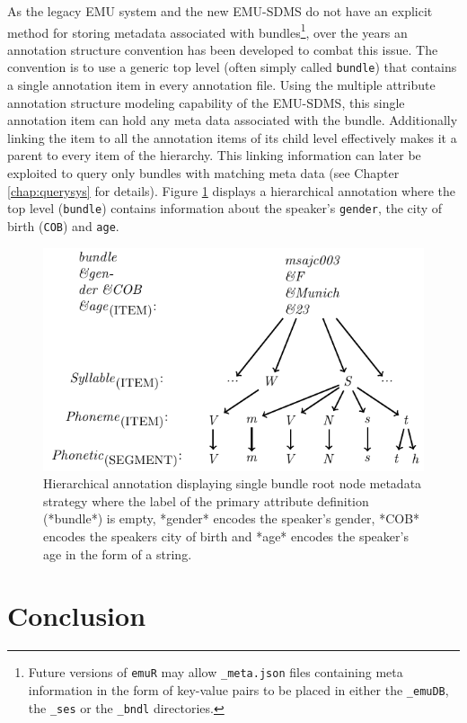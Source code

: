\documentclass[]{book}
\let\rmarkdownfootnote\footnote%
\def\footnote{\protect\rmarkdownfootnote}
\theoremstyle{definition}
\theoremstyle{definition}
\theoremstyle{definition}
\theoremstyle{remark}
\begin{document}
As the legacy EMU system and the new EMU-SDMS do not have an explicit
method for storing metadata associated with bundles\footnote{Future
  versions of \texttt{emuR} may allow \texttt{\_meta.json} files
  containing meta information in the form of key-value pairs to be
  placed in either the \texttt{\_emuDB}, the \texttt{\_ses} or the
  \texttt{\_bndl} directories.}, over the years an annotation structure
convention has been developed to combat this issue. The convention is to
use a generic top level (often simply called \texttt{bundle}) that
contains a single annotation item in every annotation file. Using the
multiple attribute annotation structure modeling capability of the
EMU-SDMS, this single annotation item can hold any meta data associated
with the bundle. Additionally linking the item to all the annotation
items of its child level effectively makes it a parent to every item of
the hierarchy. This linking information can later be exploited to query
only bundles with matching meta data (see Chapter \ref{chap:querysys}
for details). Figure \ref{fig:singleBundleRootNode} displays a
hierarchical annotation where the top level (\texttt{bundle}) contains
information about the speaker's \texttt{gender}, the city of birth
(\texttt{COB}) and \texttt{age}.

\begin{figure}

{\centering \includegraphics[width=0.65\linewidth]{pics/singleBundleRootNode} 

}

\caption{Hierarchical annotation displaying single bundle root node metadata strategy where the label of the primary attribute definition (*bundle*) is empty, *gender* encodes the speaker's gender, *COB* encodes the speakers city of birth and *age* encodes the speaker's age in the form of a string.}\label{fig:singleBundleRootNode}
\end{figure}

\hypertarget{conclusion-1}{%
\section{Conclusion}\label{conclusion-1}}
\end{document}
